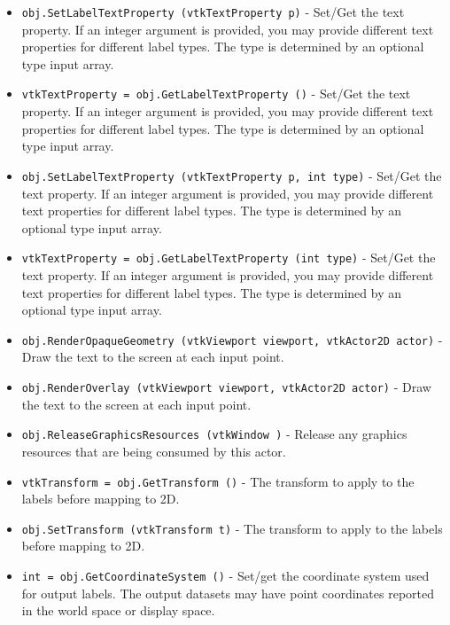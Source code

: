 \begin{itemize}
\item  \verb|obj.SetLabelTextProperty (vtkTextProperty p)| -  Set/Get the text property.
 If an integer argument is provided, you may provide different text
 properties for different label types. The type is determined by an
 optional type input array.

\item  \verb|vtkTextProperty = obj.GetLabelTextProperty ()| -  Set/Get the text property.
 If an integer argument is provided, you may provide different text
 properties for different label types. The type is determined by an
 optional type input array.

\item  \verb|obj.SetLabelTextProperty (vtkTextProperty p, int type)| -  Set/Get the text property.
 If an integer argument is provided, you may provide different text
 properties for different label types. The type is determined by an
 optional type input array.

\item  \verb|vtkTextProperty = obj.GetLabelTextProperty (int type)| -  Set/Get the text property.
 If an integer argument is provided, you may provide different text
 properties for different label types. The type is determined by an
 optional type input array.

\item  \verb|obj.RenderOpaqueGeometry (vtkViewport viewport, vtkActor2D actor)| -  Draw the text to the screen at each input point.

\item  \verb|obj.RenderOverlay (vtkViewport viewport, vtkActor2D actor)| -  Draw the text to the screen at each input point.

\item  \verb|obj.ReleaseGraphicsResources (vtkWindow )| -  Release any graphics resources that are being consumed by this actor.

\item  \verb|vtkTransform = obj.GetTransform ()| -  The transform to apply to the labels before mapping to 2D.

\item  \verb|obj.SetTransform (vtkTransform t)| -  The transform to apply to the labels before mapping to 2D.

\item  \verb|int = obj.GetCoordinateSystem ()| -  Set/get the coordinate system used for output labels.
 The output datasets may have point coordinates reported in the world space or display space.


\end{itemize}
